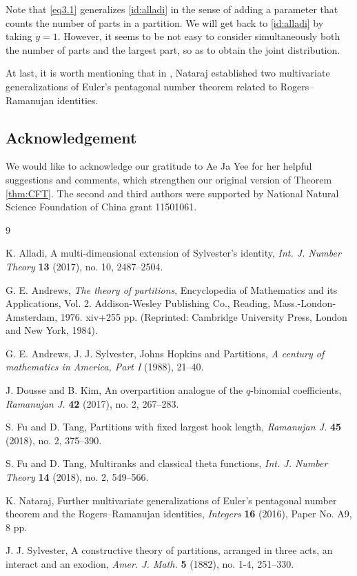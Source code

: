 \documentclass[12pt,reqno]{amsart}
\numberwithin{equation}{section}
\theoremstyle{plain}
\theoremstyle{definition}
\begin{document}
Note that \eqref{eq3.1} generalizes \eqref{id:alladi}  in the sense of adding a parameter that counts the number of parts in a partition. We will get back to \eqref{id:alladi} by taking $y=1$. However, it seems to be not easy to consider simultaneously both the number of parts and the largest part, so as to obtain the joint distribution.

At last, it is worth mentioning that in \cite{Nat}, Nataraj established two multivariate generalizations of Euler's pentagonal number theorem related to Rogers--Ramanujan identities.



\subsection*{Acknowledgement}


We would like to acknowledge our gratitude to Ae Ja Yee for her helpful suggestions and comments, which strengthen our original version of Theorem \ref{thm:CFT}. The second and third authors were supported by  National Natural Science Foundation of China grant 11501061.



\begin{thebibliography}{9}

 K. Alladi, A multi-dimensional extension of Sylvester's identity, \textit{Int. J. Number Theory} \textbf{13} (2017), no. 10, 2487--2504.

 G. E. Andrews, \textit{The theory of partitions}, Encyclopedia of Mathematics and its Applications, Vol. 2. Addison-Wesley Publishing Co., Reading, Mass.-London-Amsterdam, 1976. xiv+255 pp. (Reprinted: Cambridge University Press, London and New York, 1984).

 G. E. Andrews, J. J. Sylvester, Johns Hopkins and Partitions, \textit{A century of mathematics in America, Part I} (1988), 21--40.

 J. Dousse and B. Kim, An overpartition analogue of the $q$-binomial coefficients, \textit{Ramanujan J.} \textbf{42} (2017), no. 2, 267--283.

 S. Fu and D. Tang, Partitions with fixed largest hook length, \textit{Ramanujan J.} \textbf{45} (2018), no. 2, 375--390.

 S. Fu and D. Tang, Multiranks and classical theta functions, \textit{Int. J. Number Theory} {\bf 14} (2018), no. 2, 549--566.

 K. Nataraj, Further multivariate generalizations of Euler's pentagonal number theorem and the Rogers--Ramanujan identities, \textit{Integers} \textbf{16} (2016), Paper No. A9, 8 pp.

 J. J. Sylvester, A constructive theory of partitions, arranged in three acts, an interact and an exodion, \textit{Amer. J. Math.} \textbf{5} (1882), no. 1-4, 251--330.


\end{thebibliography}
\end{document}
